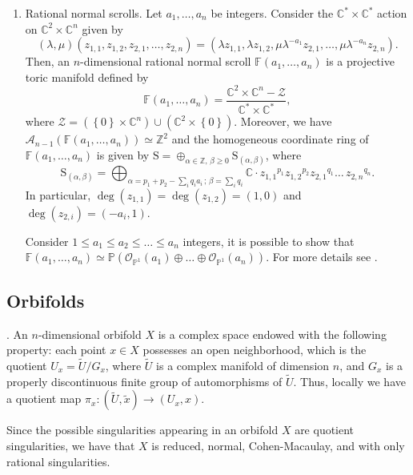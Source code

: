 \documentclass[11pt]{amsart}
\theoremstyle{plain}
\theoremstyle{definition}
\begin{document}
\begin{enumerate}
 \item \label{exe4} Rational normal scrolls.
Let $a_1,\ldots,a_n$ be integers. Consider the $\mathbb{C}^*\times\mathbb{C}^*$ action on $\mathbb{C}^2\times\mathbb{C}^n$ given by 
$$(\lambda,\mu)(z_{1,1},z_{1,2},z_{2,1},\dots,z_{2,n})=(\lambda z_{1,1}, \lambda z_{1,2}, \mu\lambda^{-a_1} z_{2,1},
\dots,\mu\lambda^{-a_n} z_{2,n}).$$
Then, an $n$-dimensional rational normal scroll $\mathbb{F}(a_1,\dots,a_n)$ is a projective toric manifold defined by 
$$\mathbb{F}(a_1,\dots,a_n)=\frac{\mathbb{C}^2\times\mathbb{C}^n-\mathcal{Z}}{\mathbb{C}^*\times\mathbb{C}^*},$$
where $\mathcal{Z}=\left(\left\{0\right\}\times\mathbb{C}^{n}\right) \cup \left(\mathbb{C}^{2}\times\left\{0\right\}\right)$.
Moreover, we have $\mathcal{A}_{n-1}(\mathbb{F}(a_1,\dots,a_n))\simeq\mathbb{Z}^2$ and the homogeneous coordinate ring of 
$\mathbb{F}(a_1,\dots,a_n)$ is given by $\mathrm{S}=\oplus_{\alpha\in\mathbb{Z},\,\beta\geq 0}\mathrm{S}_{(\alpha,\beta)}$, where 
$$\mathrm{S}_{(\alpha,\beta)}=\bigoplus_{\alpha=p_1+p_2 - \sum_iq_ia_i\,;
\,\beta=\sum_iq_i} \mathbb{C}\cdot {z_{1,1}}^{p_1}{z_{1,2}}^{p_2}{z_{2,1}}^{q_1}\dots\,{z_{2,n}}^{q_n}.$$
In particular, $\deg(z_{1,1})=\deg(z_{1,2})=(1,0)$ and $\deg(z_{2,i})=(-a_i,1)$.

Consider  $1\leq a_1 \leq a_2 \leq \dots \leq a_n$ integers, it is possible to show that $\mathbb{F}(a_1,\dots,a_n)\simeq\mathbb{P}(\mathcal{O}_{\mathbb{P}^1}(a_1)\oplus\dots\oplus\mathcal{O}_{\mathbb{P}^1}(a_n))$. For more details see \cite{Cox2, Re}.
\end{enumerate}

\vspace{0,1cm}

\subsection{Orbifolds} \label{orbif}\cite{Rua, Bla, Sata, Man}. 
An $n$-dimensional orbifold $X$ is a complex space endowed with the following property: each point $x\in X$ possesses an open neighborhood, which is the quotient $U_x=\widetilde{U}/G_x$, where $\widetilde{U}$
is a complex manifold of dimension $n$, and $G_x$ is a properly discontinuous finite group of automorphisms of $\widetilde{U}$.
Thus, locally we have a quotient map $\pi_x:(\widetilde{U},\tilde{x})\rightarrow(U_x,x)$.

Since the possible singularities appearing in an orbifold $X$ are quotient singularities, we have that $X$ is reduced, normal, Cohen-Macaulay,  and with only rational singularities. 
\end{document}
